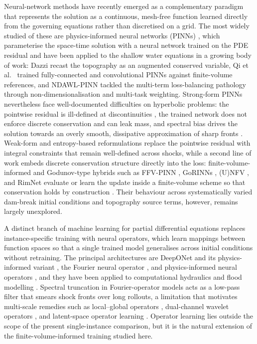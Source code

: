 \documentclass[12pt]{article}
\newenvironment{newtext}{\par\color{red}}{\par}
\begin{document}
\begin{newtext}
Neural-network methods have recently emerged as a complementary paradigm that represents the solution as a continuous, mesh-free function learned directly from the governing equations rather than discretised on a grid. The most widely studied of these are physics-informed neural networks (PINNs) \cite{raissi2019physics}, which parameterise the space-time solution with a neural network trained on the PDE residual and have been applied to the shallow water equations in a growing body of work: Dazzi \cite{dazzi2024augmented} recast the topography as an augmented conserved variable, Qi et al.~\cite{qi2024pinnswe} trained fully-connected and convolutional PINNs against finite-volume references, and NDAWL-PINN \cite{qi2025ndawl} tackled the multi-term loss-balancing pathology through non-dimensionalisation and multi-task weighting. Strong-form PINNs nevertheless face well-documented difficulties on hyperbolic problems: the pointwise residual is ill-defined at discontinuities \cite{mao2020highspeed}, the trained network does not enforce discrete conservation and can leak mass, and spectral bias drives the solution towards an overly smooth, dissipative approximation of sharp fronts \cite{rahaman2019spectral}. Weak-form and entropy-based reformulations \cite{oubarka2026wepinn} replace the pointwise residual with integral constraints that remain well-defined across shocks, while a second line of work embeds discrete conservation structure directly into the loss: finite-volume-informed and Godunov-type hybrids such as FFV-PINN \cite{wei2025ffvpinn}, GoRINNs \cite{patsatzis2025gorinns}, (U)NFV \cite{lichtle2025unfv}, and RimNet \cite{wu2025rimnet} evaluate or learn the update inside a finite-volume scheme so that conservation holds by construction \cite{liu2026fvmpinn}. Their behaviour across systematically varied dam-break initial conditions and topography source terms, however, remains largely unexplored.

A distinct branch of machine learning for partial differential equations replaces instance-specific training with neural operators, which learn mappings between function spaces so that a single trained model generalises across initial conditions without retraining. The principal architectures are DeepONet \cite{lu2021deeponet} and its physics-informed variant \cite{wang2021pideeponet}, the Fourier neural operator \cite{li2021fourier,kovachki2023neuraloperator}, and physics-informed neural operators \cite{li2024pino}, and they have been applied to computational hydraulics and flood modelling \cite{liu2026hydraulics,keppler2025pinoswe,secchi2026debrisflow}. Spectral truncation in Fourier-operator models acts as a low-pass filter that smears shock fronts over long rollouts, a limitation that motivates multi-scale remedies such as local--global operators \cite{wang2026lgno}, dual-channel wavelet operators \cite{lu2026dcmawno}, and latent-space operator learning \cite{kontolati2024latent}. Operator learning lies outside the scope of the present single-instance comparison, but it is the natural extension of the finite-volume-informed training studied here.


\end{newtext}
\end{document}
